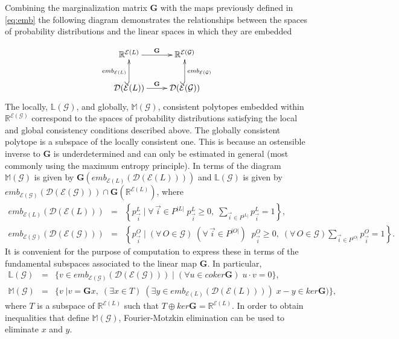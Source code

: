 Combining the marginalization matrix $\mathbf{G}$ with the maps previously defined in \ref{eq:emb} the following diagram demonstrates the relationships between the spaces of probability distributions and the linear spaces in which they are embedded

\begin{equation*}
\xymatrix{
 \mathbb{R}^{\mathcal{E}(L)} \ar[r]^{\mathbf{G}} &
   \mathbb{R}^{\mathcal{E}(\mathcal{G})} \\
 \dist (\mathcal{E}(L)) \ar[r]^{\mathbf{G}} \ar@{^{(}->}[u]^{emb_{\mathcal{E}(L)}}& \ar@{^{(}->}[u]_{emb_{\mathcal{E}(\mathcal{G})}}
  \dist (\mathcal{E}(\mathcal{G}))
  }
\end{equation*}
The locally, $\mathbb{L}(\mathcal{G})$, and globally, $\mathbb{M}(\mathcal{G})$, consistent polytopes embedded within $\mathbb{R}^{\mathcal{E}(\mathcal{G})}$ correspond to the spaces of probability distributions satisfying the local and global consistency conditions described above. The globally consistent polytope is a subspace of the locally consistent one. This is because an ostensible inverse to $\mathbf{G}$ is underdetermined and can only be estimated in general (most commonly using the maximum entropy principle). In terms of the diagram $\mathbb{M}(\mathcal{G})$ is given by $\mathbf{G}(emb_{\mathcal{E}(L)}(\mathcal{D}(\mathcal{E}(L))))$ and $\mathbb{L}(\mathcal{G})$ is given by $emb_{\mathcal{E}(\mathcal{G})}(\mathcal{D}(\mathcal{E}(\mathcal{G}))) \cap \mathbf{G}(\mathbb{R}^{\mathcal{E}(L)})$, where
\begin{eqnarray}
emb_{\mathcal{E}(L)}(\mathcal{D}(\mathcal{E}(L))) &=& \left\{ p^L_{\vec{i}} \; \bigg| \; \forall\, \vec{i} \in P^{|L|} \; p^L_{\vec{i}} \geq 0, \; \sum_{\vec{i} \in P^{|L|}} p^L_{\vec{i}} = 1 \right\},\\
emb_{\mathcal{E}(\mathcal{G})}(\mathcal{D}(\mathcal{E}(\mathcal{G}))) &=& \left\{ p^{O}_{\vec{i}} \; \bigg| \; (\forall\, O \in \mathcal{G}) \; (\forall\, \vec{i} \in P^{|O|}) \;\; p^O_{\vec{i}} \geq 0, \; (\forall\, O \in \mathcal{G}) \sum_{\vec{i} \in P^{|O|}} p^{O}_{\vec{i}} = 1 \right\}.
\end{eqnarray}
It is convenient for the purpose of computation to express these in terms of the fundamental subspaces associated to the linear map $\mathbf{G}$. In particular,
\begin{eqnarray}
\mathbb{L}(\mathcal{G}) &=& \{ v \in emb_{\mathcal{E}(\mathcal{G})}(\mathcal{D}(\mathcal{E}(\mathcal{G}))) \; | \; (\forall u \in coker \mathbf{G}) \; u \cdot v = 0\},\label{eq:localpolytope}\\
\mathbb{M}(\mathcal{G}) &=& \{ v \; | v = \mathbf{G} x,\; (\exists x \in T) \; (\exists y \in emb_{\mathcal{E}(L)}(\mathcal{D}(\mathcal{E}(L))))\; x-y \in ker \mathbf{G})  \},\label{eq:globalpolytope}
\end{eqnarray}
where $T$ is a subspace of $\mathbb{R}^{\mathcal{E}(L)}$ such that $T \oplus ker \mathbf{G} = \mathbb{R}^{\mathcal{E}(L)}$. In order to obtain inequalities that define $\mathbb{M}(\mathcal{G})$, Fourier-Motzkin elimination can be used to eliminate $x$ and $y$.

